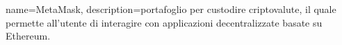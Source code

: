 {
	name={MetaMask},
	description={portafoglio per custodire criptovalute, il quale permette all'utente di interagire con applicazioni decentralizzate basate su Ethereum.}
}